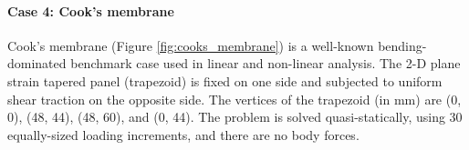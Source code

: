 \documentclass[sn-mathphys,Numbered]{sn-jnl}%
\begin{document}
\paragraph{Case 4: Cook's membrane}
Cook's membrane (Figure \ref{fig:cooks_membrane}) is a well-known bending-dominated benchmark case used in linear and non-linear analysis.
The 2-D plane strain tapered panel (trapezoid) is fixed on one side and subjected to uniform shear traction on the opposite side.
The vertices of the trapezoid (in mm) are (0, 0), (48, 44), (48, 60),  and (0, 44).
The problem is solved quasi-statically, using 30 equally-sized loading increments, and there are no body forces.
\end{document}
